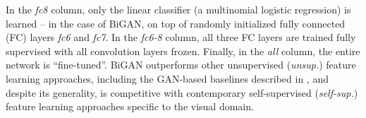 \begin{table}
{In the \textit{fc8} column, only the linear classifier (a multinomial logistic regression) is learned -- in the case of BiGAN, on top of randomly initialized fully connected (FC) layers \textit{fc6} and \textit{fc7}.
In the \textit{fc6-8} column, all three FC layers are trained fully supervised with all convolution layers frozen.
Finally, in the \textit{all} column, the entire network is ``fine-tuned''.
BiGAN outperforms other unsupervised (\textit{unsup.}) feature learning approaches, including the GAN-based baselines described in ,
and despite its generality, is competitive with contemporary self-supervised (\textit{self-sup.}) feature learning approaches specific to the visual domain.
}
\end{table}
